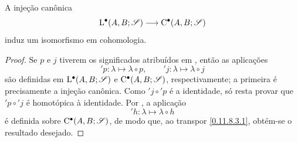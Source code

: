 \begin{proposition}[11.8.5]
\label{0.11.8.5}
A injeção canônica
\[
  \mathrm{L}^\bullet(A,B;\mathscr{S})
  \longrightarrow
  \mathrm{C}^\bullet(A,B;\mathscr{S})
\]
induz um isomorfismo em cohomologia.
\end{proposition}

\begin{proof}
Se $p$ e $j$ tiverem os significados atribuídos em , então
as aplicações
\[
  {}'\!p:\lambda\longmapsto\lambda\circ p,
  \qquad
  {}'\!j:\lambda\longmapsto\lambda\circ j
\]
são definidas em $\mathrm{L}^\bullet(A,B;\mathscr{S})$ e
$\mathrm{C}^\bullet(A,B;\mathscr{S})$, respectivamente; a primeira é precisamente
a injeção canônica.
Como ${}'\!j\circ{}'\!p$ é a identidade, só resta provar
que ${}'\!p\circ{}'\!j$ é homotópica à identidade.
Por , a aplicação
\[
  {}'\!h:\lambda\longmapsto\lambda\circ h
\]
é definida sobre $\mathrm{C}^\bullet(A,B;\mathscr{S})$, de modo que, ao transpor
\eqref{0.11.8.3.1}, obtém-se o resultado desejado.
\end{proof}


